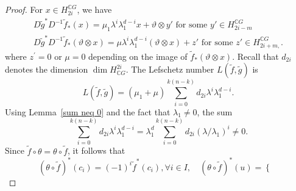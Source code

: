 \documentclass{amsart}
\newcommand{\lemref}[1]{Lemma~\ref{#1}}
\begin{document}
\begin{proof}
	For $x\in H_{2i}^{\mathbb{C}G}$, we %
have 
	\begin{equation*}\label{D cal}
		\begin{split}
			D\tilde g^* D^{-1} \tilde f_*(x)=\mu_1 \lambda^i\lambda_1^{d-i} x + \vartheta\otimes y'\text{ for some }y' \in H^{\mathbb CG}_{2i-m}\\
			D\tilde g^* D^{-1} \tilde f_*(\vartheta\otimes x)= \mu \lambda^i\lambda_1^{d-i}(\vartheta\otimes x)+z' \text{ for some }z'\in H_{2i+m,}^{\mathbb CG}.
		\end{split}
	\end{equation*}
	where %
$z^{'} =0$ or $\mu =0$ depending on the image of $\tilde{f}_*(\vartheta \otimes x)$.
	Recall that  %
$d_{2i}$ denotes the %
dimension $\dim H^{2i}_{\mathbb CG}$. The Lefschetz number  $L(\tilde{f},\tilde g)$ is
	\begin{equation*}\label{L(f,g)}
		L(\tilde f,\tilde g) =(\mu_1 + \mu) \sum_{i=0}^{k(n-k)} d_{2i} \lambda^i\lambda_1^{d-i}.
	\end{equation*}
Using  \lemref{sum neq 0} and %
the fact that $\lambda_1\neq 0$, the %
sum
	\[
	\sum_{i=0}^{k(n-k)} d_{2i} \lambda^i\lambda_1^{d-i}=\lambda_1^d\sum_{i=0}^{k(n-k)} d_{2i} (\lambda/\lambda_1)^i\neq 0.
	\]
	Since %
$\tilde f\circ\theta=\theta\circ \tilde f$, it follows that $$(\theta\circ \tilde  f )^*(c_i)= (-1)^i \tilde{f}^*(c_i), \forall i \in I, \quad (\theta \circ\tilde  f)^*(u)=\begin{cases}

\end{cases}$$
\end{proof}
\end{document}
